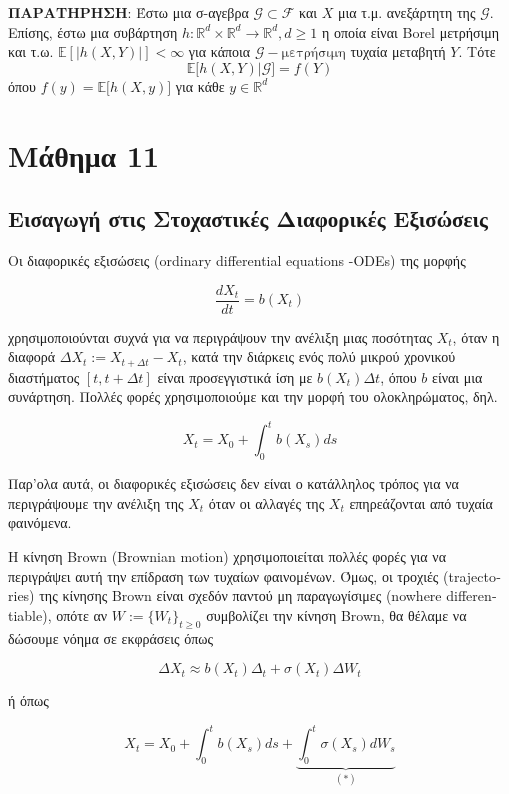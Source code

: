 \documentclass[12pt,a4paper]{article}
\theoremstyle{definition}
\numberwithin{equation}{section}
\begin{document}
\textbf{ΠΑΡΑΤΗΡΗΣΗ}: Έστω μια σ-αγεβρα \(\mathcal{G}\subset \mathcal{F}\) και \(X\) μια τ.μ. ανεξάρτητη της \(\mathcal{G}\). Επίσης, έστω μια συβάρτηση \(h: \mathbb{R}^d \times \mathbb{R}^d \rightarrow \mathbb{R}^d, d \geq 1\) η οποία είναι
\textlatin{Borel} μετρήσιμη και τ.ω. \(\mathbb{E}[|h(X,Y)|] < \infty\) για κάποια \(\mathcal{G}-\text{μετρήσιμη}\) τυχαία μεταβητή \(Y\). Τότε
$$ \mathbb{E}\big[ h(X,Y) | \mathcal{G} \big]  = f(Y)$$
όπου \(f(y) = \mathbb{E}\big[h(X,y)\big]\) για κάθε \(y \in \mathbb{R}^d\)

\pagebreak

\section{Μάθημα 11}
\label{sec:org6d772c8}
\subsection{Εισαγωγή στις Στοχαστικές Διαφορικές Εξισώσεις}
\label{sec:orgb4d6fe8}

Οι διαφορικές εξισώσεις \textlatin{(ordinary differential equations -ODEs)} της μορφής

$$ \frac{dX_t}{dt} = b(X_t) $$

χρησιμοποιούνται συχνά για να περιγράψουν την ανέλιξη μιας ποσότητας \(X_t\), όταν η διαφορά \(\Delta X_t := X_{t+\Delta t} - X_t\), κατά την διάρκεις ενός πολύ μικρού χρονικού διαστήματος \([t, t+\Delta t]\) είναι προσεγγιστικά ίση με \(b(X_t)\Delta t\), όπου \(b\) είναι μια συνάρτηση. Πολλές φορές χρησιμοποιούμε και
την μορφή του ολοκληρώματος, δηλ.

$$ X_t = X_0 + \int_0^t b(X_s)ds $$

Παρ'ολα αυτά, οι διαφορικές εξισώσεις δεν είναι ο κατάλληλος τρόπος για να περιγράψουμε την ανέλιξη της \(X_t\) όταν οι αλλαγές της \(X_t\)
επηρεάζονται από τυχαία φαινόμενα.

Η κίνηση \textlatin{Brown (Brownian motion)} χρησιμοποιείται πολλές φορές για να περιγράψει αυτή την επίδραση των τυχαίων φαινομένων.
Όμως, οι τροχιές \textlatin{(trajectories)} της κίνησης \textlatin{Brown} είναι σχεδόν παντού μη παραγωγίσιμες \textlatin{(nowhere differentiable)}, οπότε αν \(W:= \{W_t\}_{t\geq 0}\) συμβολίζει την κίνηση \textlatin{Brown}, θα θέλαμε να δώσουμε νόημα σε εκφράσεις
όπως

$$ \Delta X_t \approx b(X_t) \Delta_t + \sigma (X_t) \Delta W_t$$

ή όπως

$$X_t = X_0 + \int_0^t b(X_s) ds + \underbrace{\int_0^t \sigma(X_s) dW_s}_{(*)} $$
\end{document}
